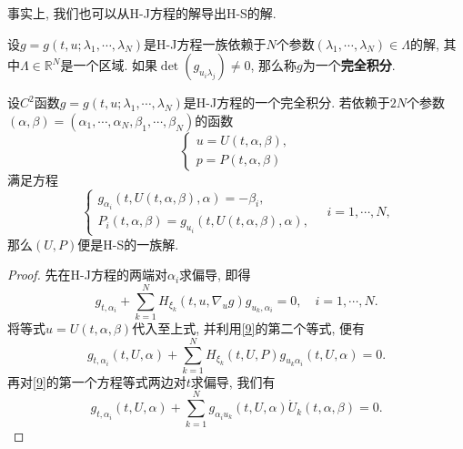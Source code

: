 事实上, 我们也可以从H-J方程的解导出H-S的解.

\begin{definition}
    设$g = g(t, u; \lambda_1, \cdots, \lambda_N)$是H-J方程一族依赖于$N$个参数$(\lambda_1, \cdots, \lambda_N) \in \Lambda$的解, 其中$\Lambda \in \mathbb{R}^N$是一个区域.
    如果$\det(g_{u_i\lambda_j}) \neq 0$, 那么称$g$为一个\textbf{完全积分}.
\end{definition}

\begin{theorem}[Jacobi]
    设$C^2$函数$g = g(t, u; \lambda_1, \cdots, \lambda_N)$是H-J方程的一个完全积分. 若依赖于$2N$个参数$(\alpha, \beta) = (\alpha_1, \cdots, \alpha_N, \beta_1, \cdots, \beta_N)$的函数 
    \begin{equation*}
        \begin{cases} 
            u = U(t, \alpha, \beta), \\  
            p = P(t, \alpha, \beta)  
        \end{cases}
    \end{equation*}
    满足方程
    \begin{equation}\label{9}
        \begin{cases} 
            g_{\alpha_i}(t, U(t, \alpha, \beta), \alpha) = -\beta_i, \\  
            P_i(t, \alpha, \beta) = g_{u_i}(t, U(t, \alpha, \beta), \alpha),  
        \end{cases}  
        \quad  i = 1, \cdots, N,
    \end{equation}
    那么$(U, P)$便是H-S的一族解.
    \begin{proof}
        先在H-J方程的两端对$\alpha_i$求偏导, 即得 
        \begin{equation*}
            g_{t, \alpha_i} + \sum_{k = 1}^NH_{\xi_k}(t, u, \nabla_ug)g_{u_k, \alpha_i} = 0, \quad i = 1, \cdots, N.
        \end{equation*}
        将等式$u = U(t, \alpha, \beta)$代入至上式, 并利用\eqref{9}的第二个等式, 便有 
        \begin{equation}\label{10}
            g_{t, \alpha_i}(t, U, \alpha) + \sum_{k = 1}^NH_{\xi_k}(t, U, P)g_{u_k\alpha_i}(t, U, \alpha) = 0.
        \end{equation}
        再对\eqref{9}的第一个方程等式两边对$t$求偏导, 我们有
        \begin{equation}\label{11}
            g_{t, \alpha_i}(t, U, \alpha) + \sum_{k = 1}^Ng_{\alpha_iu_k}(t, U, \alpha)\dot U_k(t, \alpha, \beta) = 0.
        \end{equation} 

\end{proof}
\end{theorem}
